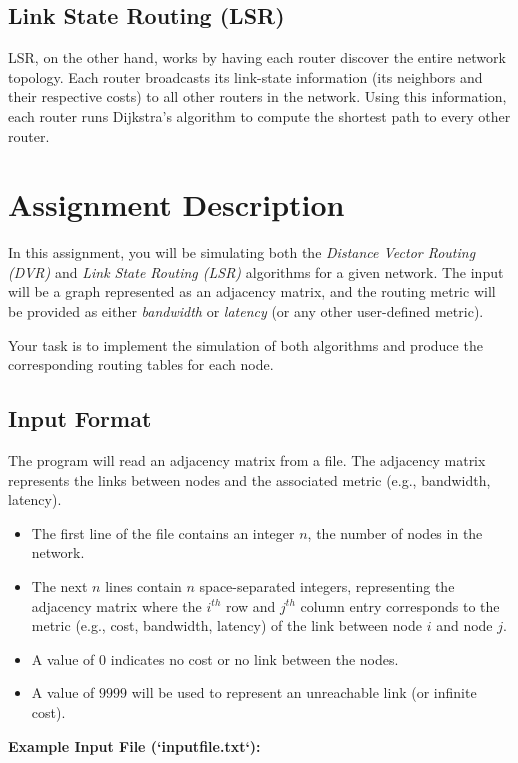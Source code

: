 \documentclass[12pt,a4paper]{article}
\begin{document}
\subsection*{Link State Routing (LSR)}
LSR, on the other hand, works by having each router discover the entire network topology. Each router broadcasts its link-state information (its neighbors and their respective costs) to all other routers in the network. Using this information, each router runs Dijkstra's algorithm to compute the shortest path to every other router.

\section*{Assignment Description}
In this assignment, you will be simulating both the \emph{Distance Vector Routing (DVR)} and \emph{Link State Routing (LSR)} algorithms for a given network. The input will be a graph represented as an adjacency matrix, and the routing metric will be provided as either \emph{bandwidth} or \emph{latency} (or any other user-defined metric).

Your task is to implement the simulation of both algorithms and produce the corresponding routing tables for each node.

\subsection*{Input Format}
The program will read an adjacency matrix from a file. The adjacency matrix represents the links between nodes and the associated metric (e.g., bandwidth, latency). 

\begin{itemize}
    \item The first line of the file contains an integer \( n \), the number of nodes in the network.
    \item The next \( n \) lines contain \( n \) space-separated integers, representing the adjacency matrix where the \( i^{th} \) row and \( j^{th} \) column entry corresponds to the metric (e.g., cost, bandwidth, latency) of the link between node \( i \) and node \( j \).
    \item A value of \( 0 \) indicates no cost or no link between the nodes.
    \item A value of \( 9999 \) will be used to represent an unreachable link (or infinite cost).
\end{itemize}

\textbf{Example Input File (`inputfile.txt`):}
\end{document}
